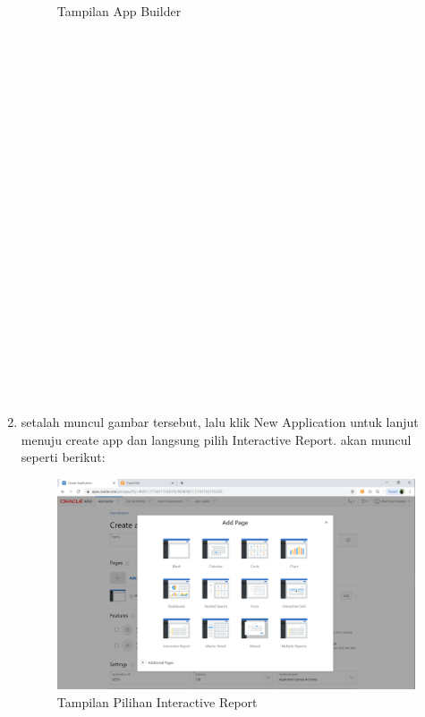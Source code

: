 \documentclass{article}
\begin{document}
\begin{enumerate}
\begin{figure}[h]
		\caption{Tampilan App Builder}
\end{figure}
 \\
\\
\\
\\
\\
\\
\\
\\
\\
\\
\\
\\
\\
\\
\\
\\
\\
\\
\\
\\
\\
	\item setalah muncul gambar tersebut, lalu klik New Application untuk lanjut menuju create app dan langsung pilih Interactive Report. akan muncul seperti berikut:
	\begin{figure}[h]
	\centering
		\includegraphics[scale=0.5]{gambar/12.PNG}
		\caption{Tampilan Pilihan Interactive Report}
\end{figure}
 \\
\\
\\
\\
\\
\\
\\
\\
\\
\\
\\

\end{enumerate}
\end{document}
